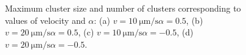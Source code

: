 \documentclass[../../master_thesis_np.tex]{subfiles}
\begin{document}
		
		\begin{figure}[hbtp]
			\centering\
			\\
			\\
			
			\caption{Maximum cluster size and number of clusters corresponding to values of velocity and $\alpha$: (a) $v = \SI{10}{\um \per \second} \alpha = 0.5$, (b) $v = \SI{20}{\um \per \second} \alpha = 0.5$, (c) $v = \SI{10}{\um \per \second} \alpha = -0.5$, (d) $v = \SI{20}{\um \per \second} \alpha = -0.5$.}
			\label{fig:lj_velocity_cluster}
		\end{figure}
\end{document}
